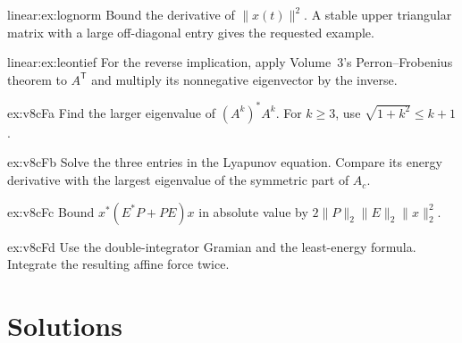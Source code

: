\begin{hint}{linear:ex:lognorm}
Bound the derivative of $\|x(t)\|^2$. A stable upper triangular matrix with a large off-diagonal entry gives the requested example.
\end{hint}
\begin{hint}{linear:ex:leontief}
For the reverse implication, apply Volume~3's Perron--Frobenius theorem to $A^{\mathsf T}$ and multiply its nonnegative eigenvector by the inverse.
\end{hint}
\begin{hint}{ex:v8cFa}
Find the larger eigenvalue of $(A^k)^*A^k$. For $k\ge3$, use $\sqrt{1+k^2}\le k+1$.
\end{hint}
\begin{hint}{ex:v8cFb}
Solve the three entries in the Lyapunov equation. Compare its energy derivative with the largest eigenvalue of the symmetric part of $A_c$.
\end{hint}
\begin{hint}{ex:v8cFc}
Bound $x^*(E^*P+PE)x$ in absolute value by $2\|P\|_2\|E\|_2\|x\|_2^2$.
\end{hint}
\begin{hint}{ex:v8cFd}
Use the double-integrator Gramian and the least-energy formula. Integrate the resulting affine force twice.
\end{hint}

\section{Solutions}

